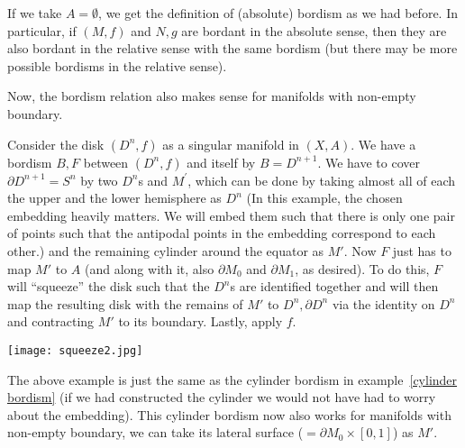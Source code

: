 \documentclass[a4paper,11pt]{article}
\begin{document}
\begin{remark}
    If we take \(A=\emptyset\), we get the definition of (absolute) bordism as we had before. In particular, if \((M,f)\) and \(N,g\) are bordant in the absolute sense, then they are also bordant in the relative sense with the same bordism (but there may be more possible bordisms in the relative sense).
\end{remark}

\begin{observation}
    Now, the bordism relation also makes sense for manifolds with non-empty boundary.
\end{observation}

\begin{example}
    Consider the disk \((D^n,f)\) as a singular manifold in \((X,A)\). 
    We have a bordism \(B,F\) between \((D^n,f)\) and itself by \(B=D^{n+1}\). We have to cover \(\partial D^{n+1}=S^n\) by two \(D^n\)s and \(M^\prime\), which can be done by taking almost all of each the upper and the lower hemisphere as \(D^n\) 
    (In this example, the chosen embedding heavily matters. We will embed them such that there is only one pair of points such that the antipodal points in the embedding correspond to each other.) 
    and the remaining cylinder around the equator as \(M'\). 
    Now \(F\) just has to map \(M'\) to \(A\) (and along with it, also \(\partial M_0\) and \(\partial M_1\), as desired). 
    To do this, \(F\) will \enquote{squeeze} the disk such that the \(D^n\)s are identified together and will then map the resulting disk with the remains of \(M'\) to \(D^n,\partial D^n\) via the identity on \(D^n\) and contracting \(M'\) to its boundary. Lastly, apply \(f\).
    \begin{center}
        \texttt{[image: squeeze2.jpg]}
    \end{center}
\end{example}

\begin{remark}
    The above example is just the same as the cylinder bordism in example\ \ref{cylinder bordism} (if we had constructed the cylinder we would not have had to worry about the embedding). This cylinder bordism now also works for manifolds with non-empty boundary, we can take its lateral surface (\(=\partial M_0\times [0,1]\)) as \(M'\).
\end{remark}
\end{document}
